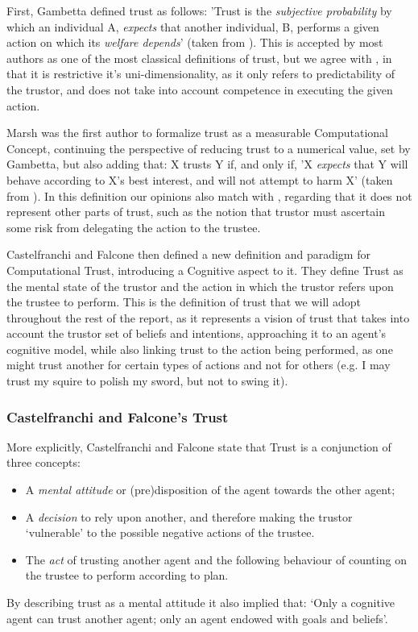 \begin{itemize}
	\tallitem First, Gambetta\cite{Gambetta1988} defined trust as follows: 'Trust is the \textit{subjective probability} by which an individual A, \textit{expects} that another individual, B, performs a given action on which its \textit{welfare depends}' (taken from \cite{Castelfranchi2010}). This is accepted by most authors as one of the most classical definitions of trust, but we agree with \cite{Castelfranchi2010}, in that it is restrictive it's uni-dimensionality, as it only refers to predictability of the trustor, and does not take into account competence in executing the given action.
	
	\tallitem Marsh\cite{Marsh1994} was the first author to formalize trust as a measurable Computational Concept, continuing the perspective of reducing trust to a numerical value, set by Gambetta\cite{Gambetta1988}, but also adding that: X trusts Y if, and only if, 'X \textit{expects} that Y will behave according to X's best interest, and will not attempt to harm X' (taken from \cite{Castelfranchi2010}). In this definition our opinions also match with \cite{Castelfranchi2010}, regarding that it does not represent other parts of trust, such as the notion that trustor must ascertain some risk from delegating the action to the trustee.
	
	\tallitem Castelfranchi and Falcone then defined a new definition and paradigm for Computational Trust, introducing a Cognitive aspect to it\cite{Castelfranchi1998}. They define Trust as the mental state of the trustor and the action in which the trustor refers upon the trustee to perform. This is the definition of trust that we will adopt throughout the rest of the report, as it represents a vision of trust that takes into account the trustor set of beliefs and intentions, approaching it to an agent's cognitive model, while also linking trust to the action being performed, as one might trust another for certain types of actions and not for others (e.g. I may trust my squire to polish my sword, but not to swing it).
\end{itemize}

\subsubsection{Castelfranchi and Falcone's Trust}
\label{subsubsec:CastelfranchiTrust}
More explicitly, Castelfranchi and Falcone\cite{Castelfranchi1998} state that Trust is a conjunction of three concepts:
\begin{itemize}
	\item A \textit{mental attitude} or (pre)disposition of the agent towards the other agent;
	\item A \textit{decision} to rely upon another, and therefore making the trustor `vulnerable' to the possible negative actions of the trustee.
	\item The \textit{act} of trusting another agent and the following behaviour of counting on the trustee to perform according to plan. 
\end{itemize}
By describing trust as a mental attitude it also implied that: `Only a cognitive agent can trust another agent; only an agent endowed with goals and beliefs'\cite{Castelfranchi2010}.

